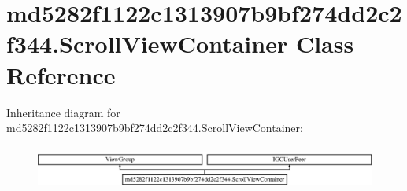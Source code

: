 \hypertarget{classmd5282f1122c1313907b9bf274dd2c2f344_1_1ScrollViewContainer}{}\section{md5282f1122c1313907b9bf274dd2c2f344.\+Scroll\+View\+Container Class Reference}
\label{classmd5282f1122c1313907b9bf274dd2c2f344_1_1ScrollViewContainer}
Inheritance diagram for md5282f1122c1313907b9bf274dd2c2f344.\+Scroll\+View\+Container\+:\begin{figure}[H]
\begin{center}
\leavevmode
\includegraphics[height=1.481482cm]{classmd5282f1122c1313907b9bf274dd2c2f344_1_1ScrollViewContainer}
\end{center}
\end{figure}
